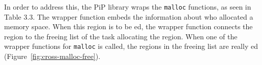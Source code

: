 In order to address this, the PiP library wraps the {\tt malloc}
functions, as seen in Table 3.3. The  wrapper
function embeds  the information about who allocated a memory
space. When this region is to be ed, the
 wrapper function connects the region to the freeing 
list of the task allocating the region. When one of the wrapper
functions for {\tt malloc} is called, the regions in the freeing list
are really ed (Figure~\ref{fig:cross-malloc-free}). 
